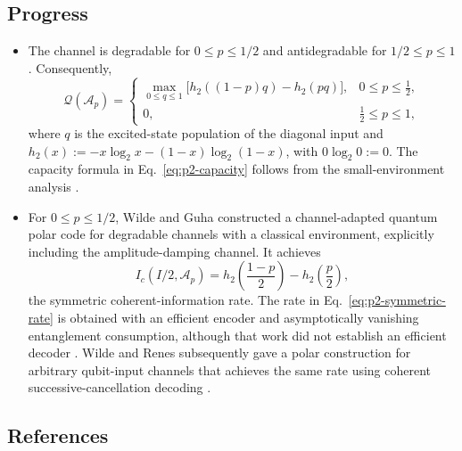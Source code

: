 \subsection*{Progress}

\begin{itemize}
  \item The channel is degradable for $0\le p\le1/2$ and antidegradable for
  $1/2\le p\le1$.  Consequently,
  \begin{equation}
    \mathcal{Q}(\mathcal A_p)=
    \begin{cases}
      \displaystyle\max_{0\le q\le1}
      \bigl[h_2((1-p)q)-h_2(pq)\bigr],&0\le p\le\tfrac12,\\[1.5mm]
      0,&\tfrac12\le p\le1,
    \end{cases}
    \label{eq:p2-capacity}
  \end{equation}
  where $q$ is the excited-state population of the diagonal input and
  $h_2(x):=-x\log_2x-(1-x)\log_2(1-x)$, with $0\log_2 0:=0$.  The capacity formula in
  Eq.~\eqref{eq:p2-capacity} follows from the small-environment analysis
  .

  \item For $0\le p\le1/2$, Wilde and Guha constructed a channel-adapted
  quantum polar code for degradable channels with a classical environment,
  explicitly including the amplitude-damping channel.  It achieves
  \begin{equation}
    I_c(I/2,\mathcal A_p)
    =h_2\!\left(\frac{1-p}{2}\right)-h_2\!\left(\frac p2\right),
    \label{eq:p2-symmetric-rate}
  \end{equation}
  the symmetric coherent-information rate.  The rate in
  Eq.~\eqref{eq:p2-symmetric-rate} is obtained with an efficient encoder and
  asymptotically vanishing entanglement consumption, although that work did
  not establish an efficient decoder .
  Wilde and Renes subsequently gave a polar construction for arbitrary
  qubit-input channels that achieves the same rate using coherent
  successive-cancellation decoding .
\end{itemize}

\subsection*{References}

